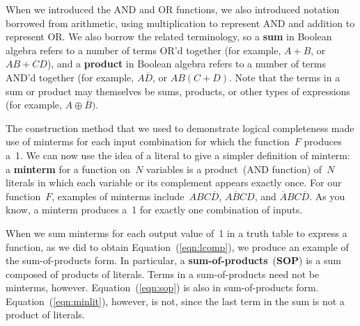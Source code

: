 When we introduced the AND and OR functions, we also introduced 
notation borrowed from arithmetic, using multiplication to represent AND
and addition to represent OR.  We also borrow the related terminology, 
so a {\bf sum} 
in Boolean algebra refers to a number of terms OR'd together 
(for example, $A+B$, or $AB+CD$), and
a {\bf product} in Boolean algebra refers to a number of terms AND'd
together (for example, $A\overline{D}$, or $AB(C+D)$.  Note that
the terms in a sum or product may themselves be sums, products, or
other types of expressions (for example, $A\oplus{\overline{B}})$.

The construction method that we used to demonstrate logical completeness
made use of minterms for each input combination for which the 
function~$F$ produces a~1.
%
We can now use the idea of a literal to give a simpler definition of minterm:
a {\bf minterm} for a function on~$N$ variables is a product~(AND 
function) of~$N$ literals in which each variable or its complement 
appears exactly once.  For our function~$F$, examples of minterms
include~$ABC\overline{D}$,
$A\overline{B}CD$, and
$\overline{A}BC\overline{D}$.
As you know, a minterm produces a~1 for exactly
one combination of inputs.

When we sum minterms for each output value of~1
in a truth table to express a function, as we did to obtain
Equation~(\ref{eqn:lcomp}), we
produce an example of the sum-of-products form.
In particular, a {\bf sum-of-products}~({\bf SOP}) is a sum composed of 
products of literals.
Terms in a sum-of-products need not be minterms, however.
Equation~(\ref{eqn:sop}) is also in sum-of-products form.
Equation~(\ref{eqn:minlit}), however, is not, since the last
term in the sum is not a product of literals.

